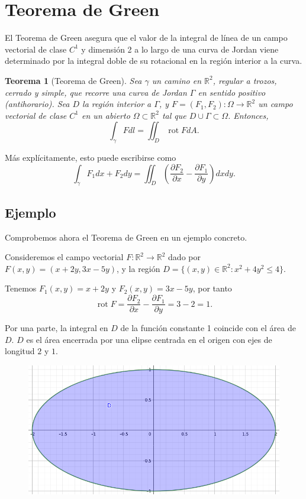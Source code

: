\documentclass[12pt,spanish]{article}
\newtheorem{theorem}{Teorema}[section]
\theoremstyle{definition}
\theoremstyle{remark}
\begin{document}
\section{Teorema de Green}

El Teorema de Green asegura que el valor de la integral de línea de un campo vectorial de clase $C^1$ y dimensión 2 a lo largo de una curva de Jordan viene determinado por la integral doble de su rotacional en la región interior a la curva. 

\begin{theorem}[Teorema de Green]
	Sea $\gamma$ un camino en $\mathbb{R}^2$, regular a trozos, cerrado y simple, que recorre una curva de Jordan $\Gamma$ en sentido positivo (antihorario). Sea $D$ la región interior a $\Gamma$, y $F=(F_1,F_2):\Omega\rightarrow\mathbb{R}^2$ un campo vectorial de clase $C^1$ en un abierto $\Omega\subset\mathbb{R}^2$ tal que $D\cup\Gamma\subset\Omega$. Entonces,
	\[\int_\gamma F dl = \iint_D \operatorname{rot}F dA.\]
\end{theorem}

Más explícitamente, esto puede escribirse como
\[\int_\gamma F_1 dx+F_2 dy=\iint_D \left(\frac{\partial F_2}{\partial x}-\frac{\partial F_1}{\partial y}\right) dx dy.\]

\subsection*{Ejemplo}

Comprobemos ahora el Teorema de Green en un ejemplo concreto.

Consideremos el campo vectorial $F:\mathbb{R}^2\rightarrow\mathbb{R}^2$ dado por $F(x,y)=(x+2y,3x-5y)$, y la región $D=\{(x,y)\in\mathbb{R}^2: x^2+4y^2\leq 4\}$.

Tenemos $F_1(x,y)=x+2y$ y $F_2(x,y)=3x-5y$, por tanto
\[\operatorname{rot}F=\frac{\partial F_2}{\partial x}-\frac{\partial F_1}{\partial y}=3-2=1.\]

Por una parte, la integral en $D$ de la función constante 1 coincide con el área de $D$. $D$ es el área encerrada por una elipse centrada en el origen con ejes de longitud $2$ y $1$.

\begin{figure}[H]
	\centering
	\includegraphics[width=120mm]{images/region-ejemplo-green}
\end{figure}
\end{document}
